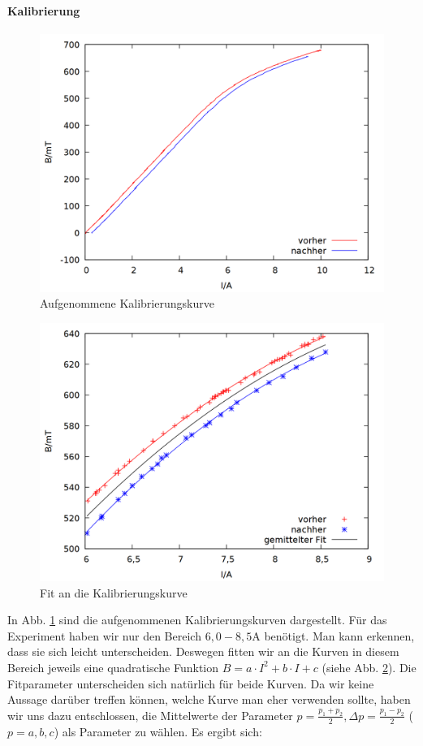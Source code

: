 \paragraph{Kalibrierung}
\begin{figure}
\centering
\includegraphics[scale=0.3]{data/zeeman/out_kalibrierung.png}
\caption{Aufgenommene Kalibrierungskurve}
\label{fig:kal_raw}
\end{figure}
\begin{figure}
\centering
\includegraphics[scale=0.3]{data/zeeman/out_kalibrierung_edit.png}
\caption{Fit an die Kalibrierungskurve}
\label{fig:kal_raw_edit}
\end{figure}
In Abb. \ref{fig:kal_raw} sind die aufgenommenen Kalibrierungskurven dargestellt. Für das Experiment haben wir nur den Bereich $6,0 - 8,5\si{\ampere}$ benötigt. Man kann erkennen, dass sie sich leicht unterscheiden. Deswegen fitten wir an die Kurven in diesem Bereich jeweils eine quadratische Funktion $B = a\cdot I^2 + b \cdot I + c$ (siehe Abb. \ref{fig:kal_raw_edit}). Die Fitparameter unterscheiden sich natürlich für beide Kurven. Da wir keine Aussage darüber treffen können, welche Kurve man eher verwenden sollte, haben wir uns dazu entschlossen, die Mittelwerte der Parameter $p = \frac{p_1+p_2}{2} , \Delta p = \frac{p_1-p_2}{2}$ ($p = a,b,c$) als Parameter zu wählen. Es ergibt sich: 
